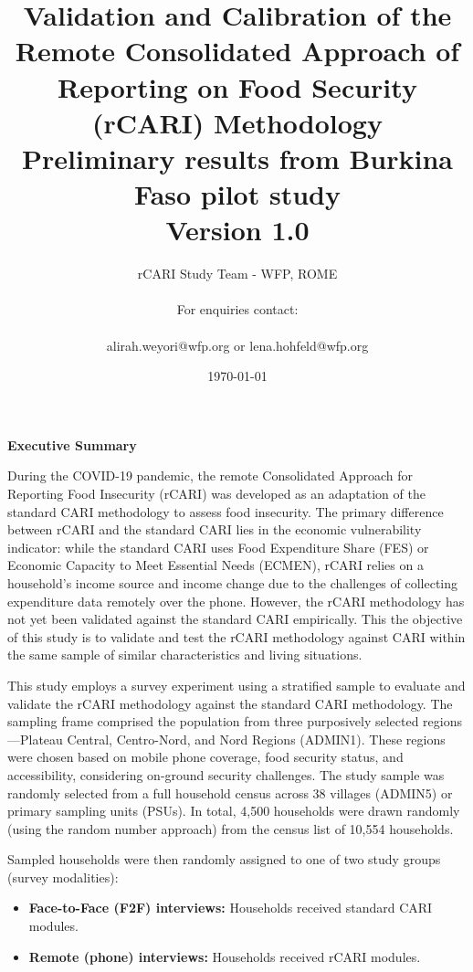 \documentclass[11pt,harvard]{article}
\author{rCARI Study Team - WFP, ROME \\	\\For enquiries contact:\\		\\alirah.weyori@wfp.org or lena.hohfeld@wfp.org}
\date{\today}
\title{Validation and Calibration of the Remote Consolidated Approach of Reporting on Food Security (rCARI) Methodology 
	\\ {\normalsize Preliminary results from Burkina Faso pilot study} 
	\\{\normalsize{Version 1.0}} }
\begin{document}
	\maketitle \vspace{-1cm}
	\onehalfspacing
	\pagebreak
	\setlength{\parskip}{6pt} %
	\tableofcontents
	\pagebreak
	
	
	\textbf{Executive Summary}
	
	During the COVID-19 pandemic, the remote Consolidated Approach for Reporting Food Insecurity (rCARI) was developed as an adaptation of the standard CARI methodology to assess food insecurity. The primary difference between rCARI and the standard CARI lies in the economic vulnerability indicator: while the standard CARI uses Food Expenditure Share (FES) or Economic Capacity to Meet Essential Needs (ECMEN), rCARI relies on a household’s income source and income change due to the challenges of collecting expenditure data remotely over the phone. However, the rCARI methodology has not yet been validated against the standard CARI empirically. This the objective of this study is to validate and test the rCARI methodology against CARI within the same sample of similar characteristics and living situations.

	This study employs a survey experiment using a stratified sample to evaluate and validate the rCARI methodology against the standard CARI methodology. The sampling frame comprised the population from  three purposively selected regions—Plateau Central, Centro-Nord, and Nord Regions (ADMIN1). These regions were chosen based on mobile phone coverage, food security status, and accessibility, considering on-ground security challenges. The study sample was randomly selected from a full household census across 38 villages (ADMIN5) or primary sampling units (PSUs). In total, 4,500 households were drawn randomly (using the random number approach) from the census list of 10,554 households. 

	Sampled households were then randomly assigned to one of two study groups (survey modalities):
	\begin{itemize}
		\item [1.] \textbf{Face-to-Face (F2F) interviews:} Households received standard CARI modules.
		\item [2.] \textbf{Remote (phone) interviews:} Households received rCARI modules.
	\end{itemize}
\end{document}
